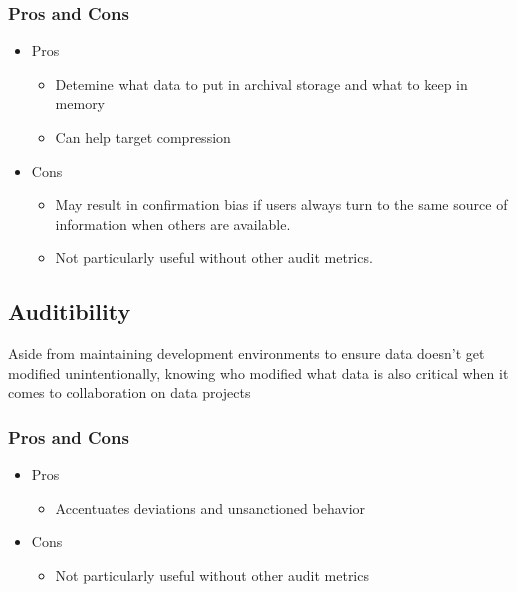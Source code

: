 \documentclass[12pt,a4paper]{article}
\begin{document}
\subsubsection{Pros and Cons}

\begin{itemize}
	\item Pros
	\begin{itemize}
		\item Detemine what data to put in archival storage and what to keep in memory
		\item Can help target compression 
	\end{itemize}
	\item Cons 
		\begin{itemize}
			\item May result in confirmation bias if users always turn to the same source of information when others are available.
			\item Not particularly useful without other audit metrics.
		\end{itemize}
\end{itemize}


\subsection{Auditibility}

Aside from maintaining development
environments to ensure data doesn’t get
modified unintentionally, knowing who
modified what data is also critical when it
comes to collaboration on data projects

\subsubsection{Pros and Cons}

\begin{itemize}
	\item Pros
\begin{itemize}
	\item Accentuates deviations and unsanctioned behavior
\end{itemize}
	\item Cons 
		\begin{itemize}
			\item Not particularly useful without other audit metrics
		\end{itemize}
\end{itemize}
\end{document}
